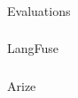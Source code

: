 \begin{frame}[fragile]\frametitle{}
\begin{center}
{\Large Evaluations}
\end{center}
\end{frame}


\begin{frame}[fragile]\frametitle{}
\begin{center}
{\Large LangFuse}
\end{center}
\end{frame}



\begin{frame}[fragile]\frametitle{}
\begin{center}
{\Large Arize}
\end{center}
\end{frame}
